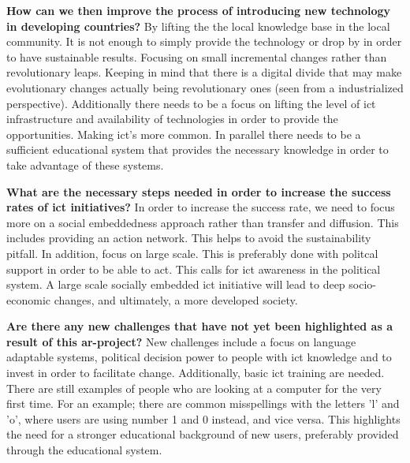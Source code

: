 \textbf{How can we then improve the process of introducing new technology in developing countries?}
By lifting the the local knowledge base in the local community. 
It is not enough to simply provide the technology or drop by in order to have sustainable results.
Focusing on small incremental changes rather than revolutionary leaps. 
Keeping in mind that there is a digital divide that may make evolutionary changes actually being revolutionary ones (seen from a industrialized perspective).
Additionally there needs to be a  focus on lifting the level of \gls{ict} infrastructure and availability of technologies in order to provide the opportunities. Making \gls{ict}'s more common. In parallel there needs to be a sufficient educational system that provides the necessary knowledge in order to take advantage of these systems. 

\textbf{What are the necessary steps needed in order to increase the success rates of \gls{ict} initiatives?}
In order to increase the success rate, we need to focus more on a social embeddedness approach rather than transfer and diffusion.
This includes providing an action network. This helps to avoid the sustainability pitfall. In addition, focus on large scale.
This is preferably done with politcal support in order to be able to act. This calls for \gls{ict} awareness in the political system.
A large scale socially embedded \gls{ict} initiative will lead to deep socio-economic changes, and ultimately, a more developed society.

\textbf{Are there any new challenges that have not yet been highlighted as a result of this \gls{ar}-project?}
New challenges include a focus on language adaptable systems, political decision power to people with \gls{ict} knowledge and to invest in order to facilitate change.
Additionally, basic \gls{ict} training are needed.
There are still examples of people who are looking at a computer for the very first time.
For an example; there are common misspellings with the letters 'l' and 'o', where users are using number 1 and 0 instead, and vice versa.
This highlights the need for a stronger educational background of new users, preferably provided through the educational system. 
